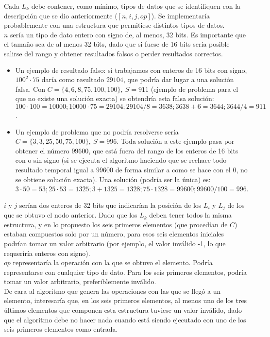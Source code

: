 \documentclass{article}
\begin{document}
Cada $L_k$ debe contener, como mínimo, tipos de datos que se identifiquen con la descripción que se dio anteriormente ($[n, i, j, op]$). Se implementaría probablemente con una estructura que permitiese distintos tipos de datos.\\

$n$ sería un tipo de dato entero con signo de, al menos, 32 bits. Es importante que el tamaño sea de al menos 32 bits, dado que si fuese de 16 bits sería posible salirse del rango y obtener resultados falsos o perder resultados correctos.
\begin{itemize}
	\item Un ejemplo de resultado falso: si trabajamos con enteros de 16 bits con signo, $100^2 \cdot 75$ daría como resultado $29104$, que podría dar lugar a una solución falsa. Con $C=\{4, 6, 8, 75, 100, 100\},\ S = 911$ (ejemplo de problema para el que no existe una solución exacta) se obtendría esta falsa solución: $100 \cdot 100=10000; 10000 \cdot 75=29104;29104/8=3638;3638+6=3644;3644/4=911$.
	\item Un ejemplo de problema que no podría resolverse sería $C=\{3, 3, 25, 50, 75, 100\},\ S = 996$. Toda solución a este ejemplo pasa por obtener el número $99600$, que está fuera del rango de los enteros de 16 bits con o sin signo (si se ejecuta el algoritmo haciendo que se rechace todo resultado temporal igual a $99600$ de forma similar a como se hace con el $0$, no se obtiene solución exacta). Una solución (podría ser la única) es: $3 \cdot 50 = 53; 25 \cdot 53 = 1325; 3+1325=1328; 75 \cdot 1328 = 99600; 99600/100=996$.
\end{itemize}

$i$ y $j$ serían dos enteros de 32 bits que indicarían la posición de los $L_i$ y $L_j$ de los que se obtuvo el nodo anterior. Dado que los $L_k$ deben tener todos la misma estructura, y en lo propuesto los seis primeros elementos (que procedían de $C$) estaban compuestos solo por un número, para esos seis elementos iniciales podrían tomar un valor arbitrario (por ejemplo, el valor inválido -1, lo que requeriría enteros con signo). \\

$op$ representaría la operación con la que se obtuvo el elemento. Podría representarse con cualquier tipo de dato. Para los seis primeros elementos, podría tomar un valor arbitrario, preferiblemente inválido.\\

De cara al algoritmo que genera las operaciones con las que se llegó a un elemento, interesaría que, en los seis primeros elementos, al menos uno de los tres últimos elementos que componen esta estructura tuviese un valor inválido, dado que el algoritmo debe no hacer nada cuando está siendo ejecutado con uno de los seis primeros elementos como entrada. \\
\end{document}
